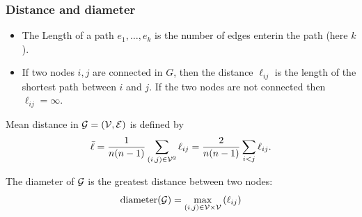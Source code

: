 \documentclass{beamer}\usepackage[]{graphicx}\usepackage[]{color}
\begin{document}
\begin{frame}[allowframebreaks]
  \frametitle{Distance and diameter}

  \begin{definition}[distance]
    \begin{itemize}
    \item \alert{The Length}  of a path $e_1,\dots, e_k$ is the number of edges enterin the path (here $k$).
    \item If two nodes $i,j$ are connected in $G$, then \alert{the distance} $\ell_{ij}$ is the length of the shortest path between $i$ and $j$. If the two nodes are not connected then $\ell_{ij} = \infty$.
    \end{itemize}
  \end{definition}

  \framebreak

  \begin{definition}
    Mean distance in $\mathcal{G} = (\mathcal{V},\mathcal{E})$ is defined by
    \[
      \bar{\ell} = \frac{1}{n(n-1)}\sum_{(i,j)\in\mathcal{V}^2} \ell_{ij} = \frac{2}{n(n-1)}\sum_{i<j} \ell_{ij}.
    \]
  \end{definition}

  \begin{definition}[diameter]
    The diameter of $\mathcal{G}$ is the greatest distance between two nodes:
    \[
      \mathrm{diameter(\mathcal{G})} = \max_{(i,j)\in\mathcal{V}\times\mathcal{V}} \left(\ell_{ij}\right)
    \]
  \end{definition}

\end{frame}
\end{document}

